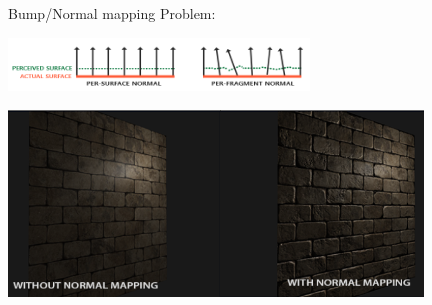 \documentclass[9pt]{beamer}
\begin{document}
\begin{frame}{Bump/Normal mapping}
	Problem:
	\begin{center}
		\includegraphics[width=8cm]{slike/normal_mapping_surfaces.png}
	\end{center}
	\begin{center}
	\includegraphics[width=11cm]{slike/normal_mapping_compare.png}
	\end{center}
\end{frame}
\end{document}
